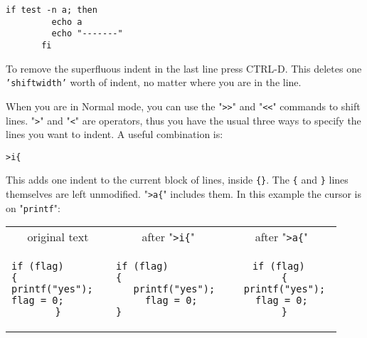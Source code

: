 \begin{Verbatim}[samepage=true]
    if test -n a; then 
         echo a 
         echo "-------" 
       fi 
\end{Verbatim}

To remove the superfluous indent in the last line press CTRL-D.
This deletes one \texttt{'shiftwidth'} worth of indent, no matter where you are in the line.

When you are in Normal mode, you can use the "\texttt{>>}" and "\texttt{<<}" commands to shift lines.
"\texttt{>}" and "\texttt{<}" are operators, thus you have the usual three ways to specify the lines you want to indent.
A useful combination is:

\begin{Verbatim}[samepage=true]
 >i{
\end{Verbatim}

This adds one indent to the current block of lines, inside \texttt{\{\}}.
The \texttt{\{} and \texttt{\}} lines themselves are left unmodified.
"\texttt{>a\{}" includes them.
In this example the cursor is on "\texttt{printf}":

\begin{center} \begin{tabular}{|c|c|c|}
				\hline
				original text & after "\texttt{>i\{}" & after "\texttt{>a\{}" \\ 
				\begin{minipage}{4cm}
				\begin{verbatim}
if (flag)       
{               
printf("yes");  
flag = 0;       
}
				\end{verbatim}
				\end{minipage}
& 
				\begin{minipage}{4cm}
				\begin{verbatim}
if (flag)         
{                 
  printf("yes");
  flag = 0; 
}                 
				\end{verbatim}
				\end{minipage}
&
				\begin{minipage}{4cm}
				\begin{verbatim}
if (flag) 
  { 
  printf("yes"); 
  flag = 0;  
  } 
				\end{verbatim}
				\end{minipage} \\
				\hline
\end{tabular} \end{center}
